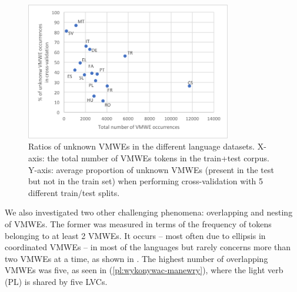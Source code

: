 \documentclass[output=paper,
modfonts,
]{langscibook}
\begin{document}
\begin{figure}
\centering
\includegraphics[width=0.8\textwidth]{figures/parseme-st-2017-BOOK-CORPUS-chart-ratio-unk-all.png}
\caption{Ratios of unknown VMWEs in the different language datasets. X-axis: the total number of VMWEs tokens in the train+test corpus. Y-axis: average proportion of unknown VMWEs (present in the test but not in the train set) when performing %
cross-validation with 5 different train/test splits.}
\label{fig:unknown-ratios}
\end{figure}

We also investigated two other challenging phenomena: overlapping and nesting of VMWEs. The former was measured in terms of the frequency of tokens belonging to at least 2 VMWEs. It occurs -- most often due to ellipsis in coordinated VMWEs -- in most of the languages but rarely concerns more than two VMWEs at a time, as shown in . 
The highest number of overlapping VMWEs was five, as seen in (\ref{pl:wykonywac-manewry}), where the light verb (PL)  is shared by five LVCs.
\end{document}
